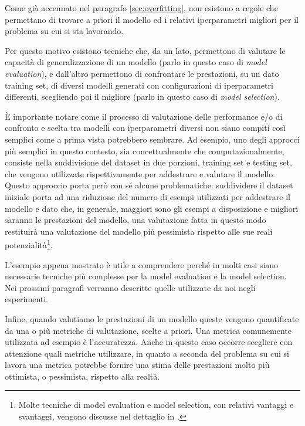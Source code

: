 \documentclass[../../main.tex]{subfiles}
\begin{document}
    Come già accennato nel paragrafo \ref{sec:overfitting}, non esistono a regole che permettano di trovare a priori il modello ed i relativi iperparametri migliori per il problema su cui si sta lavorando.

    Per questo motivo esistono tecniche che, da un lato, permettono di valutare le capacità di generalizzazione di un modello (parlo in questo caso di \textit{model evaluation}), e dall'altro permettono di confrontare le prestazioni, su un dato training set, di diversi modelli generati con configurazioni di iperparametri differenti, scegliendo poi il migliore (parlo in questo caso di \textit{model selection}).
   
    È importante notare come il processo di valutazione delle performance e/o di confronto e scelta tra modelli con iperparametri diversi non siano compiti così semplici come a prima vista potrebbero sembrare. Ad esempio, uno degli approcci più semplici in questo contesto, sia concettualmente che computazionalmente, consiste nella suddivisione del dataset in due porzioni, training set e testing set, che vengono utilizzate rispettivamente per addestrare e valutare il modello.\\
    Questo approccio porta però con sé alcune problematiche: suddividere il dataset iniziale porta ad una riduzione del numero di esempi utilizzati per addestrare il modello e dato che, in generale, maggiori sono gli esempi a disposizione e migliori saranno le prestazioni del modello, una valutazione fatta in questo modo restituirà una valutazione del modello più pessimista rispetto alle sue reali potenzialità\footnote{Molte tecniche di model evaluation e model selection, con relativi vantaggi e svantaggi, vengono discusse nel dettaglio in \cite{raschka2020model}.}.

    L'esempio appena mostrato è utile a comprendere perché in molti casi siano necessarie tecniche più complesse per la model evaluation e la model selection. Nei prossimi paragrafi verranno descritte quelle utilizzate da noi negli esperimenti.

    Infine, quando valutiamo le prestazioni di un modello queste vengono quantificate da una o più metriche di valutazione, scelte a priori. Una metrica comunemente utilizzata ad esempio è l'accuratezza. Anche in questo caso occorre scegliere con attenzione quali metriche utilizzare, in quanto a seconda del problema su cui si lavora una metrica potrebbe fornire una stima delle prestazioni molto più ottimista, o pessimista, rispetto alla realtà.
\end{document}

